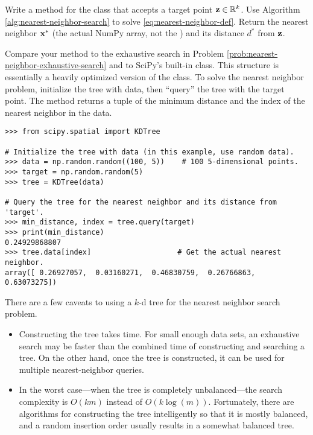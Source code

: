 \begin{problem} %
\label{prob:kdtree-nearest-neighbor-search}
Write a method for the  class that accepts a target point $\mathbf{z}\in\mathbb{R}^k$.
Use Algorithm \ref{alg:nearest-neighbor-search} to solve \eqref{eq:nearest-neighbor-def}.
Return the nearest neighbor $\mathbf{x}^*$ (the actual NumPy array, not the ) and its distance $d^*$ from $\mathbf{z}$.

Compare your method to the exhaustive search in Problem \ref{prob:nearest-neighbor-exhaustive-search} and to SciPy's built-in  class.
This structure is essentially a heavily optimized version of the  class.
To solve the nearest neighbor problem, initialize the tree with data, then ``query'' the tree with the target point.
The  method returns a tuple of the minimum distance and the index of the nearest neighbor in the data.

\begin{lstlisting}
>>> from scipy.spatial import KDTree

# Initialize the tree with data (in this example, use random data).
>>> data = np.random.random((100, 5))    # 100 5-dimensional points.
>>> target = np.random.random(5)
>>> tree = KDTree(data)

# Query the tree for the nearest neighbor and its distance from 'target'.
>>> min_distance, index = tree.query(target)
>>> print(min_distance)
0.24929868807
>>> tree.data[index]                    # Get the actual nearest neighbor.
array([ 0.26927057,  0.03160271,  0.46830759,  0.26766863,  0.63073275])
\end{lstlisting}
\end{problem}

\begin{warn}
There are a few caveats to using a $k$-d tree for the nearest neighbor search problem.
\begin{itemize}
\item Constructing the tree takes time.
For small enough data sets, an exhaustive search may be faster than the combined time of constructing and searching a tree.
On the other hand, once the tree is constructed, it can be used for multiple nearest-neighbor queries.
\item In the worst case---when the tree is completely unbalanced---the search complexity is $O(km)$ instead of $O(k\log(m))$.
Fortunately, there are algorithms for constructing the tree intelligently so that it is mostly balanced, and a random insertion order usually results in a somewhat balanced tree.
\end{itemize}
\end{warn}

